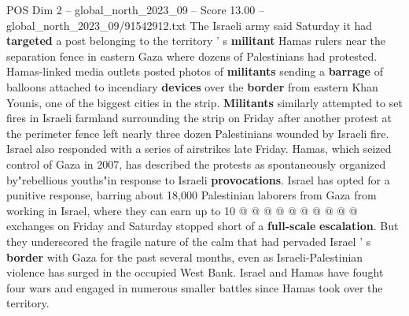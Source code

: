 \begin{textsample}{POS Dim 2 – global\_north\_2023\_09 – Score 13.00 – global\_north\_2023\_09/91542912.txt}
The Israeli army said Saturday it had \textbf{targeted} a post belonging to the territory ' s \textbf{militant} Hamas rulers near the separation fence in eastern Gaza where dozens of Palestinians had protested.
Hamas-linked media outlets posted photos of \textbf{militants} sending a \textbf{barrage} of balloons attached to incendiary \textbf{devices} over the \textbf{border} from eastern Khan Younis, one of the biggest cities in the strip. \textbf{Militants} similarly attempted to set fires in Israeli farmland surrounding the strip on Friday after another protest at the perimeter fence left nearly three dozen Palestinians wounded by Israeli fire.
Israel also responded with a series of airstrikes late Friday.
Hamas, which seized control of Gaza in 2007, has described the protests as spontaneously organized by"rebellious youths"in response to Israeli \textbf{provocations}.
Israel has opted for a punitive response, barring about 18,000 Palestinian laborers from Gaza from working in Israel, where they can earn up to 10 @ @ @ @ @ @ @ @ @ @ exchanges on Friday and Saturday stopped short of a \textbf{full-scale} \textbf{escalation}.
But they underscored the fragile nature of the calm that had pervaded Israel ' s \textbf{border} with Gaza for the past several months, even as Israeli-Palestinian violence has surged in the occupied West Bank.
Israel and Hamas have fought four wars and engaged in numerous smaller battles since Hamas took over the territory.

\end{textsample}
